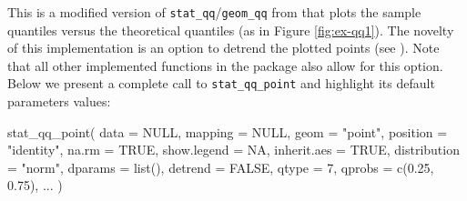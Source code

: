This is a modified version of \texttt{stat\_qq}/\texttt{geom\_qq} from
 that plots the sample quantiles versus the theoretical
quantiles (as in Figure \ref{fig:ex-qq1}). The novelty of this
implementation is an option to detrend the plotted points (see
). Note that all other implemented functions
in the  package also allow for this option. Below we
present a complete call to \texttt{stat\_qq\_point} and highlight its
default parameters values:

\begin{Schunk}
\begin{Sinput}
stat_qq_point(
  data = NULL,
  mapping = NULL,
  geom = "point",
  position = "identity",
  na.rm = TRUE,
  show.legend = NA,
  inherit.aes = TRUE,
  distribution = "norm",
  dparams = list(),
  detrend = FALSE,
  qtype = 7,
  qprobs = c(0.25, 0.75),
  ...
  )
\end{Sinput}
\end{Schunk}

